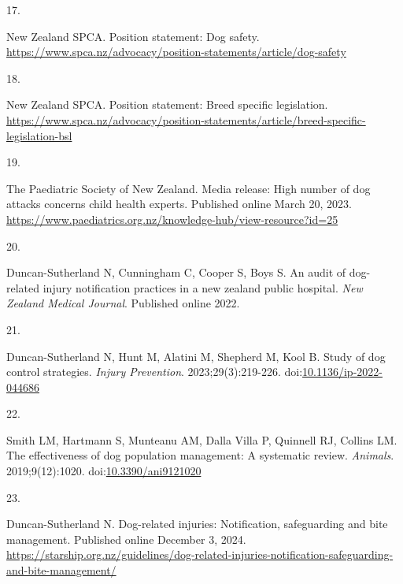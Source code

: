 \documentclass[
  letterpaper,
  DIV=11,
  numbers=noendperiod]{scrartcl}
\newlength{\cslhangindent}
\newlength{\csllabelwidth}
\newenvironment{CSLReferences}[2] %
 {\begin{list}{}{%
  \setlength{\itemindent}{0pt}
  \setlength{\leftmargin}{0pt}
  \setlength{\parsep}{0pt}
  \ifodd #1
   \setlength{\leftmargin}{\cslhangindent}
   \setlength{\itemindent}{-1\cslhangindent}
  \fi
  \setlength{\itemsep}{#2\baselineskip}}}
 {\end{list}}
\newcommand{\CSLLeftMargin}[1]{\parbox[t]{\csllabelwidth}{\strut#1\strut}}
\newcommand{\CSLRightInline}[1]{\parbox[t]{\linewidth - \csllabelwidth}{\strut#1\strut}}
\begin{document}
\begin{CSLReferences}{0}{1}
\CSLLeftMargin{17. }%
\CSLRightInline{New Zealand SPCA. Position statement: Dog safety.
\url{https://www.spca.nz/advocacy/position-statements/article/dog-safety}}

\CSLLeftMargin{18. }%
\CSLRightInline{New Zealand SPCA. Position statement: Breed specific
legislation.
\url{https://www.spca.nz/advocacy/position-statements/article/breed-specific-legislation-bsl}}

\CSLLeftMargin{19. }%
\CSLRightInline{The Paediatric Society of New Zealand. Media release:
High number of dog attacks concerns child health experts. Published
online March 20, 2023.
\url{https://www.paediatrics.org.nz/knowledge-hub/view-resource?id=25}}

\CSLLeftMargin{20. }%
\CSLRightInline{Duncan-Sutherland N, Cunningham C, Cooper S, Boys S. An
audit of dog-related injury notification practices in a new zealand
public hospital. \emph{New Zealand Medical Journal}. Published online
2022.}

\CSLLeftMargin{21. }%
\CSLRightInline{Duncan-Sutherland N, Hunt M, Alatini M, Shepherd M, Kool
B. Study of dog control strategies. \emph{Injury Prevention}.
2023;29(3):219-226.
doi:\href{https://doi.org/10.1136/ip-2022-044686}{10.1136/ip-2022-044686}}

\CSLLeftMargin{22. }%
\CSLRightInline{Smith LM, Hartmann S, Munteanu AM, Dalla Villa P,
Quinnell RJ, Collins LM. The effectiveness of dog population management:
A systematic review. \emph{Animals}. 2019;9(12):1020.
doi:\href{https://doi.org/10.3390/ani9121020}{10.3390/ani9121020}}

\CSLLeftMargin{23. }%
\CSLRightInline{Duncan-Sutherland N. Dog-related injuries: Notification,
safeguarding and bite management. Published online December 3, 2024.
\url{https://starship.org.nz/guidelines/dog-related-injuries-notification-safeguarding-and-bite-management/}}

\end{CSLReferences}
\end{document}
